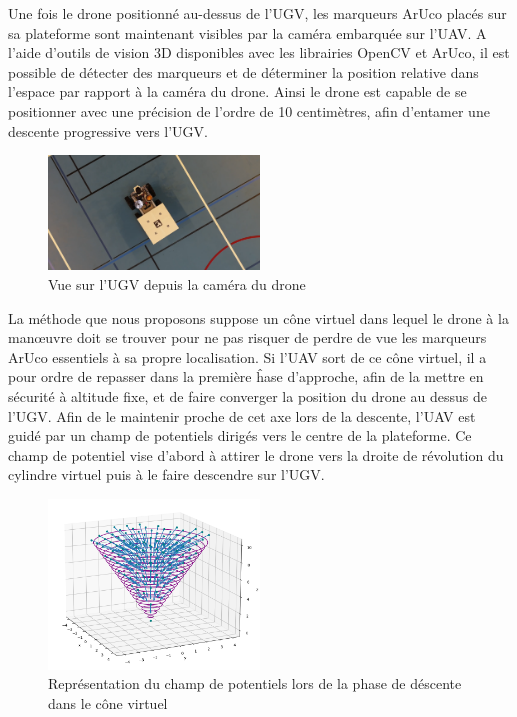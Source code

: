 Une fois le drone positionné au-dessus de l’UGV, les marqueurs ArUco placés sur sa plateforme sont maintenant visibles par la caméra embarquée sur l’UAV. A l’aide d’outils de vision 3D disponibles avec les librairies OpenCV et ArUco, il est possible de détecter des marqueurs et de déterminer la position relative dans l’espace par rapport à la caméra du drone. Ainsi le drone est capable de se positionner avec une précision de l’ordre de 10 centimètres, afin d’entamer une descente progressive vers l’UGV.

\begin{figure}[H]
    \centering\includegraphics[width=0.5\textwidth]{images/phases_approche/ugv_upview.png}
    \caption{Vue sur l'UGV depuis la caméra du drone}
\end{figure}

La méthode que nous proposons suppose un cône virtuel dans lequel le drone à la manœuvre doit se trouver pour ne pas risquer de perdre de vue les marqueurs ArUco essentiels à sa propre localisation. Si l’UAV sort de ce cône virtuel, il a pour ordre de repasser dans la première ĥase d’approche, afin de la mettre en sécurité à altitude fixe, et de faire converger la position du drone au dessus de l’UGV. Afin de le maintenir proche de cet axe lors de la descente, l’UAV est guidé par un champ de potentiels dirigés vers le centre de la plateforme. Ce champ de potentiel vise d’abord à attirer le drone vers la droite de révolution du cylindre virtuel puis à le faire descendre sur l’UGV.

\begin{figure}[H]
    \centering\includegraphics[width=0.5\textwidth]{images/phases_approche/potent_phase_2.png}
    \caption{Représentation du champ de potentiels lors de la phase de déscente dans le cône virtuel \cite{quiver}}
\end{figure}
